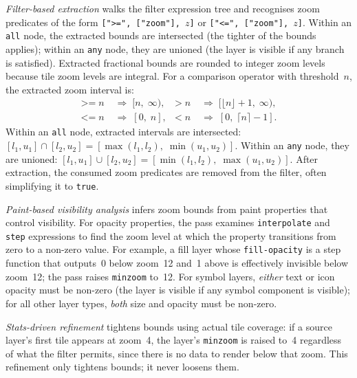 \emph{Filter-based extraction} walks the filter expression tree and recognises zoom predicates of the form \texttt{[">=",~["zoom"],~$z$]} or \texttt{["<=",~["zoom"],~$z$]}.
Within an \texttt{all} node, the extracted bounds are intersected (the tighter of the bounds applies); within an \texttt{any} node, they are unioned (the layer is visible if any branch is satisfied).
Extracted fractional bounds are rounded to integer zoom levels because tile zoom levels are integral.
For a comparison operator with threshold~$n$, the extracted zoom interval is:
\begin{equation}\label{eq:zoom_bounds}
    \begin{aligned}
        \texttt{>=}\; n &\;\Rightarrow\; [n,\;\infty), &
        \texttt{>}\; n  &\;\Rightarrow\; [\lfloor n \rfloor + 1,\;\infty), \\
        \texttt{<=}\; n &\;\Rightarrow\; [0,\; n], &
        \texttt{<}\; n  &\;\Rightarrow\; [0,\; \lceil n \rceil - 1].
    \end{aligned}
\end{equation}
Within an \texttt{all} node, extracted intervals are intersected: $[l_1, u_1] \cap [l_2, u_2] = [\max(l_1, l_2),\; \min(u_1, u_2)]$.
Within an \texttt{any} node, they are unioned: $[l_1, u_1] \cup [l_2, u_2] = [\min(l_1, l_2),\; \max(u_1, u_2)]$.
After extraction, the consumed zoom predicates are removed from the filter, often simplifying it to \texttt{true}.

\emph{Paint-based visibility analysis} infers zoom bounds from paint properties that control visibility.
For opacity properties, the pass examines \texttt{interpolate} and \texttt{step} expressions to find the zoom level at which the property transitions from zero to a non-zero value.
For example, a fill layer whose \texttt{fill-opacity} is a step function that outputs~0 below zoom~12 and~1 above is effectively invisible below zoom~12; the pass raises \texttt{minzoom} to~12.
For symbol layers, \emph{either} text or icon opacity must be non-zero (the layer is visible if any symbol component is visible); for all other layer types, \emph{both} size and opacity must be non-zero.

\emph{Stats-driven refinement} tightens bounds using actual tile coverage: if a source layer's first tile appears at zoom~4, the layer's \texttt{minzoom} is raised to~4 regardless of what the filter permits, since there is no data to render below that zoom.
This refinement only tightens bounds; it never loosens them.

